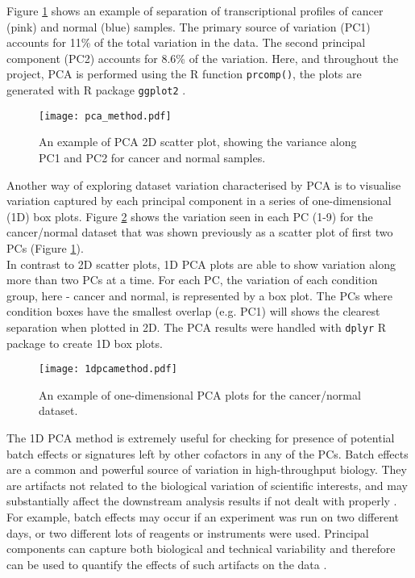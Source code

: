     Figure \ref{fig:pcamethod} shows an example of separation of transcriptional profiles of cancer (pink) and normal (blue) samples. The primary source of variation (PC1) accounts for 11\% of the total variation in the data. The second principal component (PC2) accounts for 8.6\% of the variation. 
    Here, and throughout the project, PCA is performed using the R function \texttt{prcomp()}, the plots are generated with R package \texttt{ggplot2} \cite{ggplot2}.
    
            \begin{figure}[!h]
            \centering
            \texttt{[image: pca\_method.pdf]}
            \caption[PCA 2D plot example]{An example of PCA 2D scatter plot, showing the variance along PC1 and PC2 for cancer and normal samples.}
            \label{fig:pcamethod}
            \end{figure}
        
    \newpage
    Another way of exploring dataset variation characterised by PCA is to visualise variation captured by each principal component in a series of one-dimensional (1D) box plots. Figure \ref{fig:1dpcamethod} shows the variation seen in each PC (1-9) for the cancer/normal dataset that was shown previously as a scatter plot of first two PCs (Figure \ref{fig:pcamethod}). \\ In contrast to 2D scatter plots, 1D PCA plots are able to show variation along more than two PCs at a time.  
    For each PC, the variation of each condition group, here - cancer and normal, is represented by a box plot. The PCs where condition boxes have the smallest overlap (e.g. PC1) will shows the clearest separation when plotted in 2D. The PCA results were handled with \texttt{dplyr} R package \cite{wickham2015dplyr} to create 1D box plots. 
       
    
            \begin{figure}[h]
            \centering
            \texttt{[image: 1dpcamethod.pdf]}
            \caption[PCA 1D plot example]{An example of one-dimensional PCA plots for the cancer/normal dataset. }
            \label{fig:1dpcamethod}
            \end{figure}
            
    The 1D PCA method is extremely useful for checking for presence of potential batch effects or signatures left by other cofactors in any of the PCs. Batch effects are a common and powerful source of variation in high-throughput biology. They are artifacts not related to the biological variation of scientific interests, and may substantially affect the downstream analysis results if not dealt with properly  \cite{Leek2010}. For example, batch effects may occur if an experiment was run on two different days, or two different lots of reagents or instruments were used. Principal components can capture both biological and technical variability and therefore can be used to quantify the effects of such artifacts on the data \cite{LeekCapturingAnalysis}.
   
